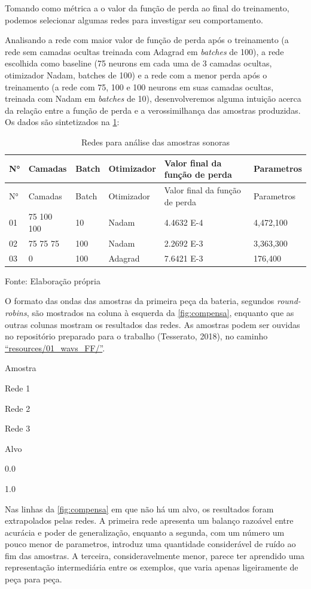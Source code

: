 \documentclass[]{article}
\begin{document}
Tomando como métrica a o valor da função de perda ao final do
treinamento, podemos selecionar algumas redes para investigar seu
comportamento.

Analisando a rede com maior valor de função de perda após o treinamento
(a rede sem camadas ocultas treinada com Adagrad em \emph{batches} de
100), a rede escolhida como baseline (75 neurons em cada uma de 3
camadas ocultas, otimizador Nadam, batches de 100) e a rede com a menor
perda após o treinamento (a rede com 75, 100 e 100 neurons em suas
camadas ocultas, treinada com Nadam em \emph{batches} de 10),
desenvolveremos alguma intuição acerca da relação entre a função de
perda e a verossimilhança das amostras produzidas. Os dados são
sintetizados na \cref{tbl:comp}:

\begin{longtable}[]{@{}llllll@{}}
\caption{Redes para análise das amostras sonoras
\label{tbl:comp}}\tabularnewline
\toprule
N° & Camadas & Batch & Otimizador & Valor final da função de perda &
Parametros\tabularnewline
\midrule
\endfirsthead
\toprule
N° & Camadas & Batch & Otimizador & Valor final da função de perda &
Parametros\tabularnewline
\midrule
\endhead
01 & 75 100 100 & 10 & Nadam & 4.4632 E-4 & 4,472,100\tabularnewline
02 & 75 75 75 & 100 & Nadam & 2.2692 E-3 & 3,363,300\tabularnewline
03 & 0 & 100 & Adagrad & 7.6421 E-3 & 176,400\tabularnewline
\bottomrule
\end{longtable}

Fonte: Elaboração própria

O formato das ondas das amostras da primeira peça da bateria, segundos
\emph{round-robins}, são mostrados na coluna à esquerda da
\cref{fig:compensa}, enquanto que as outras colunas
mostram os resultados das redes. As amostras podem ser ouvidas no
repositório preparado para o trabalho (Tesserato, 2018), no caminho
\href{https://github.com/tesserato/tesserato.github.io/tree/master/resources/01_wavs_FF}{``resources/01\_wavs\_FF/''}.

Amostra

Rede 1

Rede 2

Rede 3

Alvo

0.0

1.0

Nas linhas da \cref{fig:compensa} em que não há um
alvo, os resultados foram extrapolados pelas redes. A primeira rede
apresenta um balanço razoável entre acurácia e poder de generalização,
enquanto a segunda, com um número um pouco menor de parametros, introduz
uma quantidade considerável de ruído ao fim das amostras. A terceira,
consideravelmente menor, parece ter aprendido uma representação
intermediária entre os exemplos, que varia apenas ligeiramente de peça
para peça.
\end{document}
